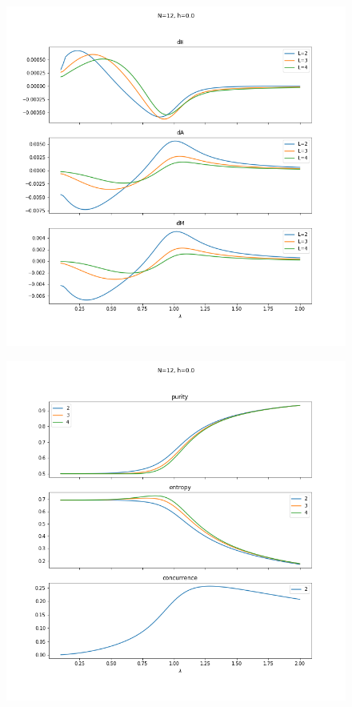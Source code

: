 \documentclass[12pt,a4paper]{article}
\begin{document}
	\begin{figure}[h]
		\centering
		\includegraphics[width=\linewidth]{h0_dergos}
		\caption{}
		\label{fig:h0dergos}
	\end{figure}	
	
	\begin{figure}[h]
		\centering
		\includegraphics[width=\linewidth]{h0_quantities}
		\caption{}
		\label{fig:h0quantities}
	\end{figure}
	
\end{document}
